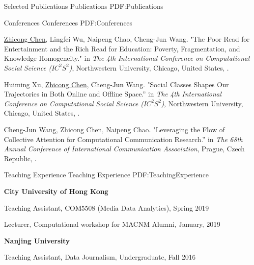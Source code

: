 \documentclass[letterpaper,MMMyyyy,nonstopmode]{CV}
\begin{document}
\begin{Body}
\Section
{Selected Publications}
{Publications}
{PDF:Publications}

\BigGap
\SubSection
{Conferences}
{Conferences}
{PDF:Conferences}

\begingroup
\renewcommand{\MaxNumberedItem}{[8888]}

\BigGap
\NumberedItem{[1]}
{\underline{Zhicong Chen}, Lingfei Wu, Naipeng Chao, Cheng-Jun Wang. 
"The Poor Read for Entertainment and the Rich Read for Education: Poverty, Fragmentation, and Knowledge Homogeneity."
in \textit{The 4th International Conference on Computational Social Science ($IC^{2}S^{2}$)},
Northwestern University, Chicago, United States,
.}

\Gap
\NumberedItem{[2]}
{Huiming Xu, \underline{Zhicong Chen}, Cheng-Jun Wang.
"Social Classes Shapes Our Trajectories in Both Online and Offline Space.''
in \textit{The 4th International Conference on Computational Social Science ($IC^{2}S^{2}$)},
Northwestern University, Chicago, United States,
.}

\Gap
\NumberedItem{[3]}
{Cheng-Jun Wang, \underline{Zhicong Chen}, Naipeng Chao.
"Leveraging the Flow of Collective Attention for Computational Communication Research.''
in \textit{The 68th Annual Conference of International Communication Association},
Prague, Czech Republic, 
.}

\endgroup


\Section
{Teaching Experience}
{Teaching Experience}
{PDF:TeachingExperience}

\Entry
{\textbf{City University of Hong Kong}}

\Gap
\BulletItem
Teaching Assistant, COM5508 (Media Data Analytics), Spring 2019

\Gap
\BulletItem
Lecturer, Computational workshop for MACNM Alumni, January, 2019

\Entry
{\textbf{Nanjing University}}

\Gap
\BulletItem
Teaching Assistant, Data Journalism, Undergraduate, Fall 2016



\end{Body}
\end{document}
